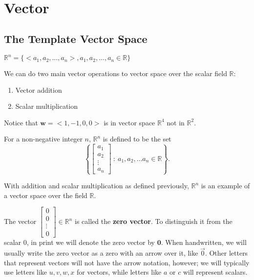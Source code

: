 \documentclass{package/notes}
\begin{document}
\section{Vector}
\subsection{The Template Vector Space}

$\mathbb{R}^n=\{<a_1,a_2,\dots, a_n>, a_1, a_2, \dots , a_n \in \mathbb{R}\}$

We can do two main vector operations to vector space over the scalar field $\mathbb{R}$:
\begin{enumerate}
    \item Vector addition
    \item Scalar multiplication
\end{enumerate}

Notice that $\boldsymbol{w}=<1,-1,0,0>$ is in vector space $\mathbb{R}^4$ not in $\mathbb{R}^2$.

\begin{definition}[$\mathbb{R}^n$]

For a non-negative integer $n$,  $\mathbb{R}^n$ is defined to be the set
\begin{equation*}
    \left\{ \left[\begin{array}{c} a_1 \\ a_2 \\ \vdots \\ a_ n \end{array} \right] \  : \  a_1, a_2, \ldots a_ n \in \mathbb R\right\} .
\end{equation*}

With addition and scalar multiplication as defined previously, $\mathbb{R}^n$ is an example of a vector space over the field $\mathbb{R}$.
\end{definition}

The vector $\left[\begin{array}{c} 0 \\ 0 \\ \vdots \\ 0 \end{array} \right] \in \mathbb R^ n$ is called the \textbf{zero vector}.
To distinguish it from the scalar 0, in print we will denote the zero vector by $\boldsymbol{0}$. When handwritten, we will usually write the zero vector as a zero with an arrow over it, like $\vec{0}$. Other letters that represent vectors will not have the arrow notation, however; we will typically use letters like $u,v,w,x$ for vectors, while letters like $a$ or $c$ will represent scalars.
\end{document}

